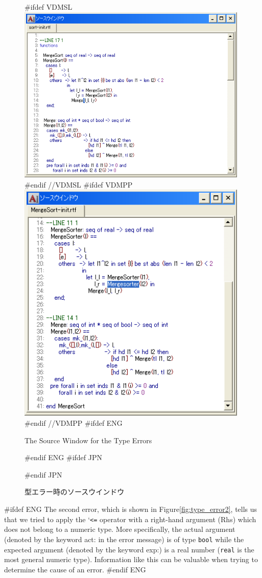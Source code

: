 \documentclass[\pformat,12pt]{article}
\newcommand{\Lit}[1]{`#1\Quote}
\newcommand{\Sig}[1]{\Lit{{\tt #1}}}
\begin{document}
\begin{figure}[tbh]
\begin{center}
#ifdef VDMSL
\includegraphics[width=11cm]{sourceWindow-type-sl.png}
#endif //VDMSL
#ifdef VDMPP
\includegraphics[width=11cm]{sourceWindow-type-pp.png}
#endif //VDMPP
#ifdef ENG
\caption{The Source Window for the Type Errors}
#endif ENG
#ifdef JPN
\caption{型エラー時のソースウインドウ}
#endif JPN
\label{fig:source-type}
\end{center}
\end{figure}

#ifdef ENG
The second error, which is shown in Figure\ref{fig:type_error2},
tells us that we tried to apply the \Sig{<=} operator with a
right-hand argument (Rhs) which does not belong to a numeric
type. More specifically, the actual argument (denoted by the keyword
{\sf act:} in the error message) is of type {\tt bool} while the 
expected argument (denoted by the keyword {\sf exp:}) is a real number
({\tt real} is the most general numeric type). Information like this
can be valuable when trying to determine the cause of an error.
#endif ENG
\end{document}
